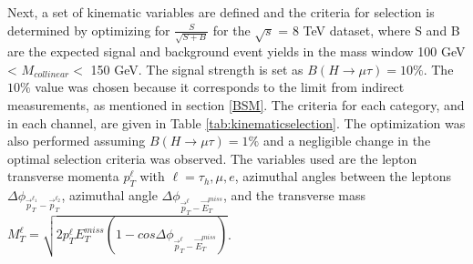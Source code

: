 \documentclass[oneside, letterpaper, oldfontcommands]{memoir}
\begin{document}
\qquad Next, a set of kinematic variables are defined and the criteria for selection is determined by optimizing for $\frac{S}{\sqrt{S+B}}$ for the $\sqrt{s}$ = 8 TeV dataset, where S and B are the expected signal and background event yields in the mass window 100 GeV < $M_{collinear} <$ 150 GeV. The signal strength is set as $B(H\rightarrow\mu\tau) = 10\%$. The $10\%$ value was chosen because it corresponds to the limit from indirect measurements, as mentioned in section \ref{BSM}. The criteria for each category, and in each channel, are given in Table \ref{tab:kinematicselection}. The optimization was also performed assuming $B(H\rightarrow\mu\tau) = 1\%$ and a negligible change in the optimal selection criteria was observed. The variables used are the lepton transverse momenta $p_{T}^{\ell}$ with $\ell = \tau_{h},\mu,e$, azimuthal angles between the leptons 
$\Delta\phi_{\vec{p}_{T}^{\ell_{1}}-\vec{p}_{T}^{\ell_{2}}}$, azimuthal angle 
$\Delta\phi_{\vec{p}_{T}^{\ell}-\vec{E}_{T}^{miss}}$, and the transverse mass 
$M_{T}^{\ell} = \sqrt{2 p_{T}^{\ell}E_{T}^{miss}(1-cos \Delta\phi_{\vec{p}_{T}^{\ell}-\vec{E}_{T}^{miss}})}$. 
\end{document}
